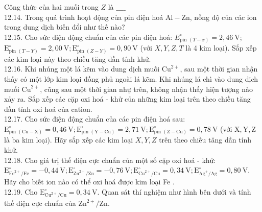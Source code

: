 \documentclass[10pt]{article}
\begin{document}
Công thức của hai muối trong $Z$ là $\_\_\_\_$\\
12.14. Trong quá trình hoạt động của pin điện hoá $\mathrm{Al}-\mathrm{Zn}$, nồng độ của các ion trong dung dịch biến đổi như thế nào?\\
12.15. Cho sức điện động chuẩn của các pin điện hoá: $E_{\text {pin }(T-x)}^{\circ}=2,46 \mathrm{~V}$; $\mathrm{E}_{\text {pin }(T-Y)}^{\circ}=2,00 \mathrm{~V} ; \mathrm{E}_{\text {pin }(Z-Y)}^{\circ}=0,90 \mathrm{~V}$ (với $X, Y, Z, T$ là 4 kim loại). Sắp xếp các kim loại này theo chiều tăng dần tính khử.\\
12.16. Khi nhúng một lá kẽm vào dung dịch muối $\mathrm{Cu}^{2+}$, sau một thời gian nhận thấy có một lớp kim loại đồng phủ ngoài lá kẽm. Khi nhúng lá chì vào dung dịch muối $\mathrm{Cu}^{2+}$, cũng sau một thời gian nhự trên, không nhận thấy hiện tượng nào xảy ra. Sắp xếp các cặp oxi hoá - khử của những kim loại trên theo chiều tăng dần tính oxi hoá của cation.\\
12.17. Cho sức điện động chuẩn của các pin điện hoá sau:\\
$\mathrm{E}_{\text {pin }(\mathrm{Cu}-\mathrm{X})}^{\circ}=0,46 \mathrm{~V} ; \mathrm{E}_{\text {pin }(\mathrm{Y}-\mathrm{Cu})}^{\circ}=2,71 \mathrm{~V} ; \mathrm{E}_{\text {pin }(\mathrm{Z}-\mathrm{Cu})}^{\circ}=0,78 \mathrm{~V}$ (với $\mathrm{X}, \mathrm{Y}, \mathrm{Z}$ là ba kim loại). Hãy sắp xếp các kim loại $X, Y, Z$ trên theo chiều tăng dần tính khử.\\
12.18. Cho giá trị thế điện cực chuẩn của một số cặp oxi hoá - khử: $\mathrm{E}_{\mathrm{Fe}^{2+} / \mathrm{Fe}}^{\circ}=-0,44 \mathrm{~V} ; \mathrm{E}_{\mathrm{Zn}^{2+} / \mathrm{Zn}}^{\circ}=-0,76 \mathrm{~V} ; \mathrm{E}_{\mathrm{Cu}^{2+} / \mathrm{Cu}}^{\circ}=0,34 \mathrm{~V} ; \mathrm{E}_{\mathrm{Ag}^{+} / \mathrm{Ag}}^{\circ}=0,80 \mathrm{~V}$. Hãy cho biết ion nào có thể oxi hoá được kim loại Fe .\\
12.19. Cho $\mathrm{E}_{\mathrm{Cu}^{2+} / \mathrm{Cu}}^{\circ}=0,34 \mathrm{~V}$. Quan sát thí nghiệm như hình bên dưới và tính thế điện cực chuẩn của $\mathrm{Zn}^{2+} / \mathrm{Zn}$.
\end{document}
